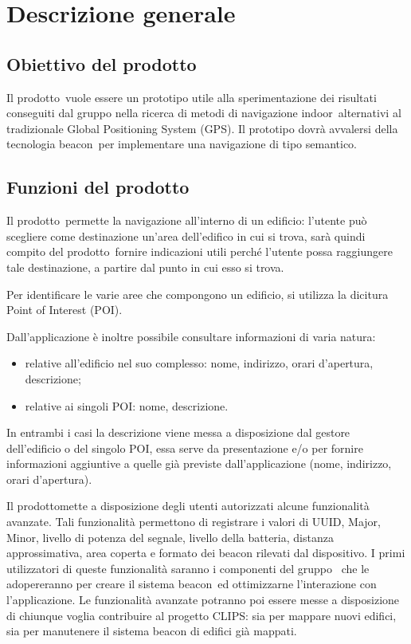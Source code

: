 \documentclass[../AnalisiDeiRequisiti.tex]{subfiles}
\begin{document}
\section{Descrizione generale}
	\subsection{Obiettivo del prodotto}
	Il prodotto\g\ vuole essere un prototipo utile alla sperimentazione dei risultati conseguiti dal gruppo nella ricerca di metodi di navigazione indoor\g\ alternativi al tradizionale Global Positioning System (GPS).
Il prototipo dovrà avvalersi della tecnologia beacon\g\ per implementare una navigazione di tipo semantico.

	\subsection{Funzioni del prodotto}
	Il prodotto\g\ permette la navigazione all'interno di un edificio: l'utente può scegliere come destinazione un'area dell'edifico in cui si trova, sarà quindi compito del prodotto\g\ fornire indicazioni utili perché l'utente possa raggiungere tale destinazione, a partire dal punto in cui esso si trova. 
	
	Per identificare le varie aree che compongono un edificio, si utilizza la dicitura Point of Interest (POI).
	
	Dall'applicazione è inoltre possibile consultare informazioni di varia natura:
	\begin{itemize}
		\item relative all’edificio nel suo complesso: nome, indirizzo, orari d'apertura, descrizione;
		\item relative ai singoli POI: nome, descrizione.
	\end{itemize}
	In entrambi i casi la descrizione viene messa a disposizione dal gestore dell'edificio o del singolo POI\g, essa serve da presentazione e/o per fornire informazioni aggiuntive a quelle già previste dall'applicazione (nome, indirizzo, orari d'apertura). 
	
	Il prodotto\g mette a disposizione degli utenti autorizzati alcune funzionalità avanzate. Tali funzionalità permettono di registrare  i valori di UUID, Major, Minor, livello di potenza del segnale, livello della batteria, distanza approssimativa, area coperta e formato dei beacon rilevati dal dispositivo. I primi utilizzatori di queste funzionalità saranno i componenti del gruppo \leaf\ che le adopereranno per creare il sistema beacon\g\ ed ottimizzarne l'interazione con l'applicazione. Le funzionalità avanzate potranno poi essere messe a disposizione di chiunque voglia contribuire al progetto CLIPS: sia per mappare nuovi edifici, sia per manutenere il sistema beacon di edifici già mappati.
		
\end{document}
